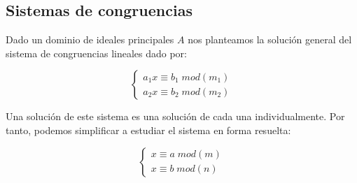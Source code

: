 \subsection{Sistemas de congruencias}

Dado un dominio de ideales principales $A$ nos planteamos la solución general del sistema de congruencias lineales dado por:

\[   
\begin{cases}
a_1x \equiv b_1 \; mod(m_1) \\
a_2x \equiv b_2 \; mod(m_2) 
\end{cases}
\]

Una solución de este sistema es una solución de cada una individualmente. Por tanto, podemos simplificar a estudiar el sistema en forma resuelta:

\[   
\begin{cases}
x \equiv a \; mod(m) \\
x \equiv b \; mod(n) 
\end{cases}
\]

